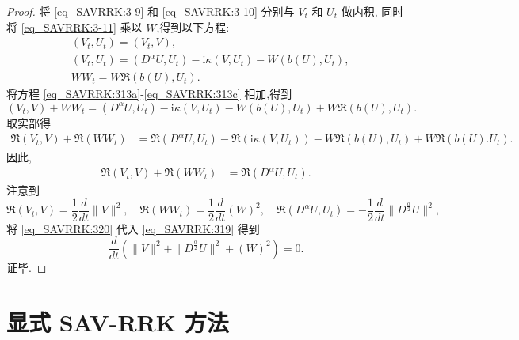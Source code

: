 \begin{proof}
	将 \eqref{eq_SAVRRK:3-9} 和 \eqref{eq_SAVRRK:3-10} 分别与 $V_t$ 和 $U_t$ 做内积, 
	同时将 \eqref{eq_SAVRRK:3-11} 乘以 $W$,得到以下方程:
\begin{align}
&\left(V_t, U_t\right)=\left(V_t, V\right), \label{eq_SAVRRK:313a}\\
&\left(V_t, U_t\right)=\left(D^{\alpha} U, U_t\right)-\mathrm{i} \kappa\left(V, U_t\right)-W\left(b(U), U_t\right), \label{eq_SAVRRK:313b}\\
&W W_t=W\Re\left(b(U), U_t\right).\label{eq_SAVRRK:313c}
\end{align}
将方程 \eqref{eq_SAVRRK:313a}-\eqref{eq_SAVRRK:313c} 相加,得到
\begin{equation}
\left(V_t, V\right) + W W_t= \left(D^{\alpha} U, U_t\right)-\mathrm{i} \kappa\left(V, U_t\right)-W\left(b(U), U_t\right) + W\Re\left(b(U), U_t\right).
\end{equation}
取实部得
\begin{align}
\Re\left(V_t, V\right) + \Re\left(W W_t\right)&= \Re\left(D^{\alpha} U, U_t\right)-\Re\left(\mathrm{i} \kappa\left(V, U_t\right)\right)-W\Re\left(b(U), U_t\right) + W\Re\left(b(U). U_t\right).
\end{align}
因此,
\begin{align}
\Re\left(V_t, V\right) + \Re\left(W W_t\right)&= \Re\left(D^{\alpha} U, U_t\right).\label{eq_SAVRRK:319}
\end{align}
注意到
\begin{equation}
\Re\left(V_t, V\right) = \frac{1}{2}\frac{d }{d t}\|V\|^2, \quad \Re\left(W W_t\right) = \frac{1}{2}\frac{d }{d t}\left(W\right)^2,\quad \Re\left(D^{\alpha} U, U_t\right)=-\frac{1}{2}\frac{d }{d t}\|D^\frac{\alpha}{2}U\|^2,\label{eq_SAVRRK:320}
\end{equation}
将 \eqref{eq_SAVRRK:320} 代入 \eqref{eq_SAVRRK:319} 得到
\begin{equation}
\frac{d }{d t}\left(\|V\|^2+\|D^\frac{\alpha}{2}U\|^2+\left(W\right)^2\right)=0.
\end{equation}
证毕.
\end{proof}

\section{显式 SAV-RRK 方法}\label{Section_SAVRRK: 4}

